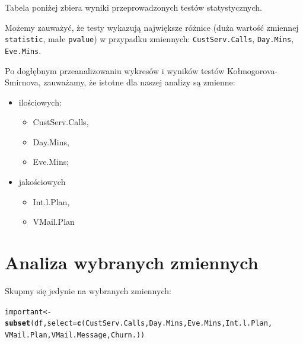 \documentclass{article}\usepackage[]{graphicx}\usepackage[]{color}
\makeatletter
\newcommand{\hlstd}[1]{\textcolor[rgb]{0.345,0.345,0.345}{#1}}%
\newcommand{\hlkwb}[1]{\textcolor[rgb]{0.69,0.353,0.396}{#1}}%
\newcommand{\hlkwc}[1]{\textcolor[rgb]{0.333,0.667,0.333}{#1}}%
\newcommand{\hlkwd}[1]{\textcolor[rgb]{0.737,0.353,0.396}{\textbf{#1}}}%
\newenvironment{kframe}{%
 \def\at@end@of@kframe{}%
 \ifinner\ifhmode%
  \def\at@end@of@kframe{\end{minipage}}%
  \begin{minipage}{\columnwidth}%
 \fi\fi%
 \def\FrameCommand##1{\hskip\@totalleftmargin \hskip-\fboxsep
 \colorbox{shadecolor}{##1}\hskip-\fboxsep
     \hskip-\linewidth \hskip-\@totalleftmargin \hskip\columnwidth}%
 \MakeFramed {\advance\hsize-\width
   \@totalleftmargin\z@ \linewidth\hsize
   \@setminipage}}%
 {\par\unskip\endMakeFramed%
 \at@end@of@kframe}
\newenvironment{knitrout}{}{} %
\makeatother
\begin{document}
Tabela poniżej zbiera wyniki przeprowadzonych testów statystycznych.
\begin{table}[!h]

\caption{\label{tab:Tabela z testami statystycznymi}Wyniki testu Kolmogorova-Smirnova}
\centering
{}
\end{table}


Możemy zauważyć, że testy wykazują największe różnice (duża wartość zmiennej \verb|statistic|, małe \verb|pvalue|) w przypadku zmiennych: \verb|CustServ.Calls|, \verb|Day.Mins|, \verb|Eve.Mins|.


Po dogłębnym przeanalizowaniu wykresów i wyników testów Kołmogorova-Smirnova, zauważamy, że istotne dla naszej analizy są zmienne:
\begin{itemize}
  \item ilościowych:
    \begin{itemize}
    \item CustServ.Calls,
    \item Day.Mins,
    \item Eve.Mins;
    \end{itemize}
  \item jakościowych
    \begin{itemize}
    \item Int.l.Plan,
    \item VMail.Plan
    \end{itemize}
\end{itemize}

\section{Analiza wybranych zmiennych}
Skupmy się jedynie na wybranych zmiennych:
\begin{knitrout}
\color{fgcolor}\begin{kframe}
\begin{alltt}
\hlstd{important} \hlkwb{<-} \hlkwd{subset}\hlstd{(df,} \hlkwc{select}\hlstd{=}\hlkwd{c}\hlstd{(CustServ.Calls, Day.Mins, Eve.Mins, Int.l.Plan,}
                                 \hlstd{VMail.Plan, VMail.Message, Churn.))}
\end{alltt}
\end{kframe}
\end{knitrout}
\end{document}
